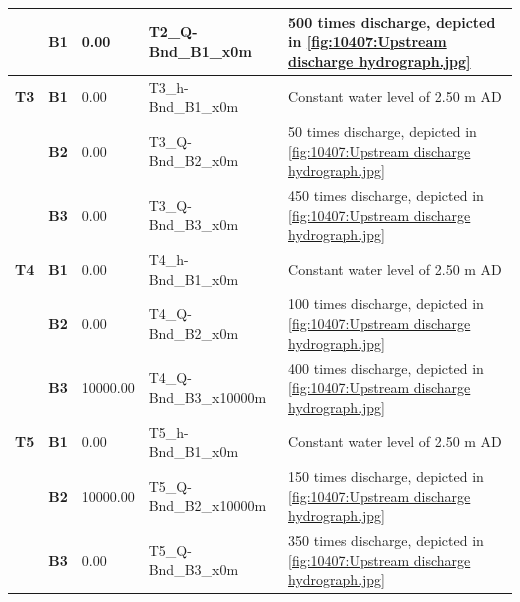 \begin{longtable}{|p{13.5mm}|p{10.5mm}|p{16.0mm}|p{29.5mm}|p{47.5mm}|}
                                               & \scriptsize\textbf{B1} & \scriptsize{0.00}     & \scriptsize{T2\_Q-Bnd\_B1\_x0m}     & \scriptsize{500 times discharge, depicted in \autoref{fig:10407:Upstream discharge hydrograph.jpg}} \\
\hline
\scriptsize\textcolor[rgb]{1,0,0}{\textbf{T3}} & \scriptsize\textbf{B1} & \scriptsize{0.00}     & \scriptsize{T3\_h-Bnd\_B1\_x0m}     & \scriptsize{Constant water level of 2.50 m AD}                                                \\
                                               & \scriptsize\textbf{B2} & \scriptsize{0.00}     & \scriptsize{T3\_Q-Bnd\_B2\_x0m}     & \scriptsize{50 times discharge, depicted in \autoref{fig:10407:Upstream discharge hydrograph.jpg}}  \\
                                               & \scriptsize\textbf{B3} & \scriptsize{0.00}     & \scriptsize{T3\_Q-Bnd\_B3\_x0m}     & \scriptsize{450 times discharge, depicted in \autoref{fig:10407:Upstream discharge hydrograph.jpg}} \\
\hline
\scriptsize\textcolor[rgb]{1,0,0}{\textbf{T4}} & \scriptsize\textbf{B1} & \scriptsize{0.00}     & \scriptsize{T4\_h-Bnd\_B1\_x0m}     & \scriptsize{Constant water level of 2.50 m AD}                                                \\
                                               & \scriptsize\textbf{B2} & \scriptsize{0.00}     & \scriptsize{T4\_Q-Bnd\_B2\_x0m}     & \scriptsize{100 times discharge, depicted in \autoref{fig:10407:Upstream discharge hydrograph.jpg}} \\
                                               & \scriptsize\textbf{B3} & \scriptsize{10000.00} & \scriptsize{T4\_Q-Bnd\_B3\_x10000m} & \scriptsize{400 times discharge, depicted in \autoref{fig:10407:Upstream discharge hydrograph.jpg}} \\
\hline
\scriptsize\textcolor[rgb]{1,0,0}{\textbf{T5}} & \scriptsize\textbf{B1} & \scriptsize{0.00}     & \scriptsize{T5\_h-Bnd\_B1\_x0m}     & \scriptsize{Constant water level of 2.50 m AD}                                                \\
                                               & \scriptsize\textbf{B2} & \scriptsize{10000.00} & \scriptsize{T5\_Q-Bnd\_B2\_x10000m} & \scriptsize{150 times discharge, depicted in \autoref{fig:10407:Upstream discharge hydrograph.jpg}} \\
                                               & \scriptsize\textbf{B3} & \scriptsize{0.00}     & \scriptsize{T5\_Q-Bnd\_B3\_x0m}     & \scriptsize{350 times discharge, depicted in \autoref{fig:10407:Upstream discharge hydrograph.jpg}} \\

\end{longtable}
